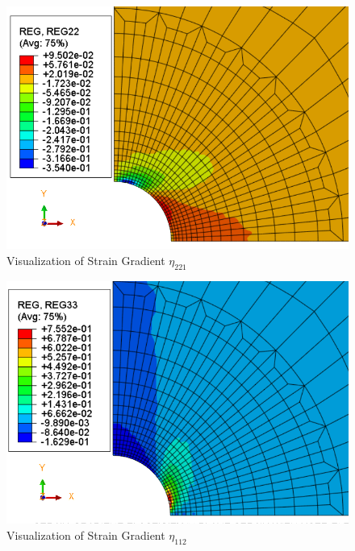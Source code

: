 \documentclass[12pt]{article}
\begin{document}
\begin{figure}[H]
	\begin{center}
		\includegraphics[scale=0.8]{Reg22_crop.png} 
	\end{center}  
   \caption{Visualization of Strain Gradient $\eta_{221} $}
\end{figure}
\begin{figure}[H]
	\begin{center}
		\includegraphics[scale=0.8]{Reg33_crop.png} 
	\end{center}  
   \caption{Visualization of Strain Gradient $\eta_{112} $}
\end{figure}
\end{document}
